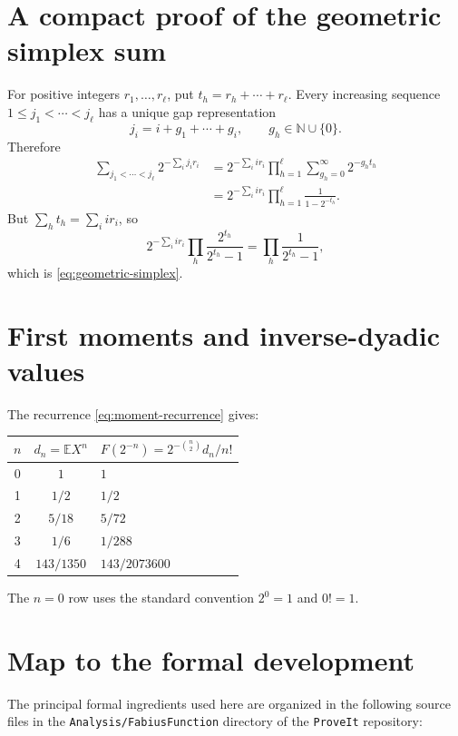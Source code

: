 \documentclass[11pt,oneside]{article}
\theoremstyle{definition}
\theoremstyle{remark}
\newcommand{\N}{\mathbb N}
\newcommand{\E}{\mathbb E}
\begin{document}
\appendix

\section{A compact proof of the geometric simplex sum}

For positive integers $r_1,\ldots,r_\ell$, put
$t_h=r_h+\cdots+r_\ell$.  Every increasing sequence
$1\le j_1<\cdots<j_\ell$ has a unique gap representation
\[
 j_i=i+g_1+\cdots+g_i,
 \qquad g_h\in\N\cup\{0\}.
\]
Therefore
\begin{align*}
 \sum_{j_1<\cdots<j_\ell}2^{-\sum_i j_ir_i}
 &=2^{-\sum_i ir_i}
   \prod_{h=1}^{\ell}
   \sum_{g_h=0}^{\infty}2^{-g_ht_h}\\
 &=2^{-\sum_i ir_i}
   \prod_{h=1}^{\ell}\frac1{1-2^{-t_h}}.
\end{align*}
But $\sum_ht_h=\sum_iir_i$, so
\[
 2^{-\sum_iir_i}\prod_h\frac{2^{t_h}}{2^{t_h}-1}
 =\prod_h\frac1{2^{t_h}-1},
\]
which is \eqref{eq:geometric-simplex}.

\section{First moments and inverse-dyadic values}

The recurrence \eqref{eq:moment-recurrence} gives:
\begin{center}
\renewcommand{\arraystretch}{1.18}
\begin{tabular}{ccl}
\toprule
$n$ & $d_n=\E X^n$ & $F(2^{-n})=2^{-\binom n2}d_n/n!$\\
\midrule
0 & $1$ & $1$\\
1 & $1/2$ & $1/2$\\
2 & $5/18$ & $5/72$\\
3 & $1/6$ & $1/288$\\
4 & $143/1350$ & $143/2073600$\\
\bottomrule
\end{tabular}
\end{center}
The $n=0$ row uses the standard convention $2^0=1$ and $0!=1$.

\section{Map to the formal development}

The principal formal ingredients used here are organized in the following
source files in the \texttt{Analysis/FabiusFunction} directory of the
\texttt{ProveIt} repository:
\end{document}
